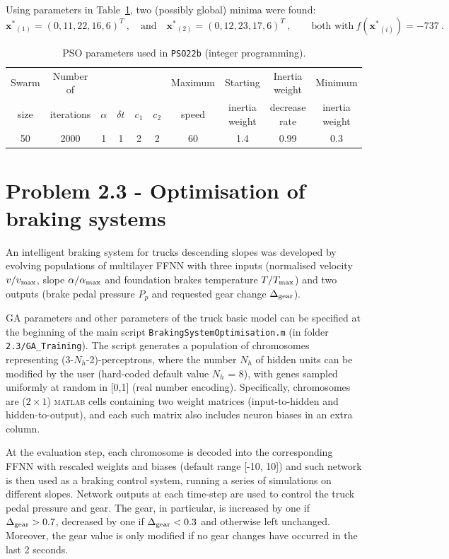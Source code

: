 \documentclass[12pt,titlepage]{article}
\begin{document}
Using parameters in Table~\ref{tab:2b}, two (possibly global) minima were found:
\[
\bm{x^{*}}_{(1)} = (0, 11, 22, 16, 6)^T \ , \quad \mbox{and} \quad \bm{x^{*}}_{(2)} = (0, 12, 23, 17, 6)^T \ , \qquad \mbox{both with} \ f(\bm{x^*}_{(i)}) = -737 \ .
\]

\begin{table}[hbtp]
\centering
\begin{tabular}{cccccccccc}
\toprule
Swarm & Number of &  &  &  &  & Maximum & Starting & Inertia weight & Minimum \\
size & iterations & $ \alpha$ & $ \delta t$ & $ c_1$ & $ c_2$ & speed & inertia weight & decrease rate & inertia weight \\
\midrule
50 & 2000 & 1 & 1 & 2 & 2 & 60 & 1.4 & 0.99 & 0.3 \\
\bottomrule
\end{tabular}
\caption{\footnotesize PSO parameters used in \texttt{PSO22b} (integer programming).}
\label{tab:2b}
\end{table}

\section*{Problem 2.3 - Optimisation of braking systems}

An intelligent braking system for trucks descending slopes was developed by evolving populations of multilayer FFNN with three inputs (normalised velocity $v/v_{\textup{max}}$, slope $\alpha / \alpha_{\textup{max}}$ and foundation brakes temperature $T/T_{\textup{max}}$) and two outputs (brake pedal pressure $ P_p$ and requested gear change $\Delta_{\textup{gear}}$).

GA parameters and other parameters of the truck basic model can be specified at the beginning of the main script \texttt{BrakingSystemOptimisation.m} (in folder \texttt{2.3/GA\_Training}). The script generates a population of chromosomes representing (3-$N_h$-2)-perceptrons, where the number $N_h$ of hidden units can be modified by the user (hard-coded default value $N_h$ = 8), with genes sampled uniformly at random in [0,1] (real number encoding). Specifically, chromosomes are ($2\times1$) \textsc{matlab} cells containing two weight matrices (input-to-hidden and hidden-to-output), and each such matrix also includes neuron biases in an extra column.
 
At the evaluation step, each chromosome is decoded into the corresponding FFNN with rescaled weights and biases (default range [-10, 10]) and such network is then used as a braking control system, running a series of simulations on different slopes. Network outputs at each time-step are used to control the truck pedal pressure and gear. The gear, in particular, is increased by one if $\Delta_{\textup{gear}} > 0.7$, decreased by one if $\Delta_{\textup{gear}} < 0.3$ and otherwise left unchanged. Moreover, the gear value is only modified if no gear changes have occurred in the last 2 seconds.  
\end{document}
